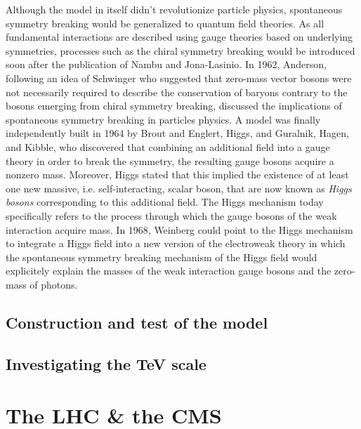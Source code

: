 	Although the model in itself didn't revolutionize particle physics, spontaneous symmetry breaking would be generalized to quantum field theories. As all fundamental interactions are described using gauge theories based on underlying symmetries, processes such as the chiral symmetry breaking would be introduced soon after the publication of Nambu and Jona-Lasinio. In 1962, Anderson, following an idea of Schwinger who suggested that zero-mass vector bosons were not necessarily required to describe the conservation of baryons contrary to the bosons emerging from chiral symmetry breaking, discussed the implications of spontaneous symmetry breaking in particles physics. A model was finally independently built in 1964 by Brout and Englert, Higgs, and Guralnik, Hagen, and Kibble, who discovered that combining an additional field into a gauge theory in order to break the symmetry, the resulting gauge bosons acquire a nonzero mass. Moreover, Higgs stated that this implied the existence of at least one new massive, i.e. self-interacting, scalar boson, that are now known as \textit{Higgs bosons} corresponding to this additional field. The Higgs mechanism today specifically refers to the process through which the gauge bosons of the weak interaction acquire mass. In 1968, Weinberg could point to the Higgs mechanism to integrate a Higgs field into a new version of the electroweak theory in which the spontaneous symmetry breaking mechanism of the Higgs field would explicitely explain the masses of the weak interaction gauge bosons and the zero-mass of photons.
	
	\subsection{Construction and test of the model}
	\label{chapt2:ssec:model}
	
	
	
	\subsection{Investigating the TeV scale}
	\label{chapt2:ssec:TeV}

\section{The \acl{LHC} \& the \acl{CMS}}
\label{chapt2:sec:LHC-CMS}

